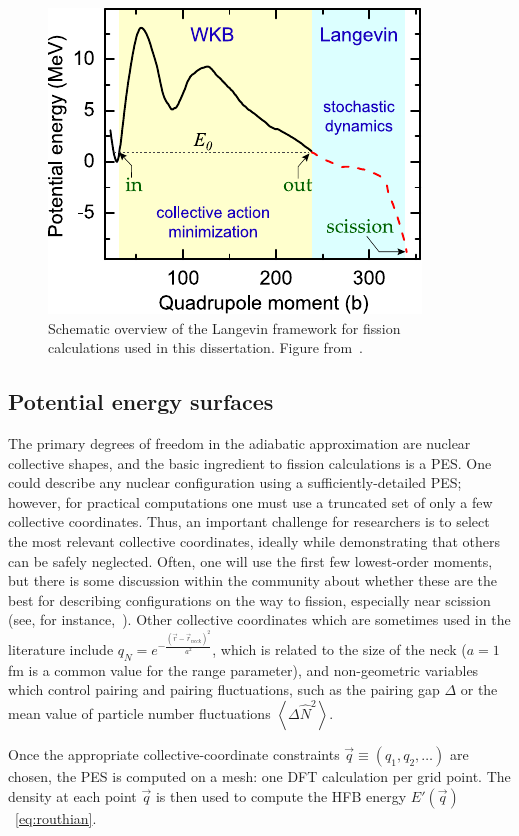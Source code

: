 \begin{figure}
	\centering
	\includegraphics[width=0.5\linewidth]{TeX_files/methods_overview}
	\caption[Schematic overview of the Langevin framework for fission calculations used in this dissertation]{Schematic overview of the Langevin framework for fission calculations used in this dissertation. Figure from~\cite{Sadhukhan2016}.}
	\label{fig:methodsoverview}
\end{figure}

\subsection{Potential energy surfaces}
The primary degrees of freedom in the adiabatic approximation are nuclear collective shapes, and the basic ingredient to fission calculations is a PES. One could describe any nuclear configuration using a sufficiently-detailed PES; however, for practical computations one must use a truncated set of only a few collective coordinates. Thus, an important challenge for researchers is to select the most relevant collective coordinates, ideally while demonstrating that others can be safely neglected. Often, one will use the first few lowest-order moments, but there is some discussion within the community about whether these are the best for describing configurations on the way to fission, especially near scission (see, for instance,~\cite{younes2012}). Other collective coordinates which are sometimes used in the literature include $q_N=e^{-\frac{(\vec{r}-\vec{r}_{neck})^2}{a^2}}$, which is related to the size of the neck ($a=1$ fm is a common value for the range parameter), and non-geometric variables which control pairing and pairing fluctuations, such as the pairing gap $\Delta$ or the mean value of particle number fluctuations $\left\langle \Delta \hat{N}^2 \right\rangle$.

Once the appropriate collective-coordinate constraints $\vec{q}\equiv(q_1, q_2, \dots)$ are chosen, the PES is computed on a mesh: one DFT calculation per grid point. The density at each point $\vec{q}$ is then used to compute the HFB energy $E'(\vec{q})$~\eqref{eq:routhian}.

